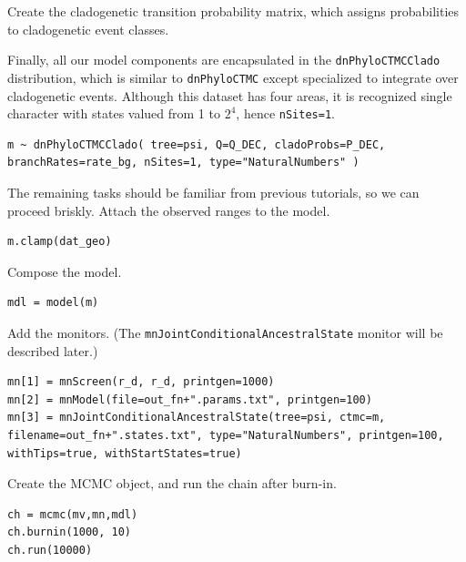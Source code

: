 Create the cladogenetic transition probability matrix, which assigns probabilities to cladogenetic event classes.

Finally, all our model components are encapsulated in the {\tt dnPhyloCTMCClado} distribution, which is similar to {\tt dnPhyloCTMC} except specialized to integrate over cladogenetic events.
Although this dataset has four areas, it is recognized single character with states valued from 1 to $2^4$, hence {\tt nSites=1}.

\begin{snugshade}
\begin{lstlisting}
m ~ dnPhyloCTMCClado( tree=psi, Q=Q_DEC, cladoProbs=P_DEC, branchRates=rate_bg, nSites=1, type="NaturalNumbers" )
\end{lstlisting}
\end{snugshade}

The remaining tasks should be familiar from previous tutorials, so we can proceed briskly.
Attach the observed ranges to the model.

\begin{snugshade}
\begin{lstlisting}
m.clamp(dat_geo)
\end{lstlisting}
\end{snugshade}

Compose the model.

\begin{snugshade}
\begin{lstlisting}
mdl = model(m)
\end{lstlisting}
\end{snugshade}

Add the monitors. (The {\tt mnJointConditionalAncestralState} monitor will be described later.)

\begin{snugshade}
\begin{lstlisting}
mn[1] = mnScreen(r_d, r_d, printgen=1000)
mn[2] = mnModel(file=out_fn+".params.txt", printgen=100)
mn[3] = mnJointConditionalAncestralState(tree=psi, ctmc=m, filename=out_fn+".states.txt", type="NaturalNumbers", printgen=100, withTips=true, withStartStates=true)
\end{lstlisting}
\end{snugshade}

Create the MCMC object, and run the chain after burn-in.
\begin{snugshade}
\begin{lstlisting}
ch = mcmc(mv,mn,mdl)
ch.burnin(1000, 10)
ch.run(10000)
\end{lstlisting}
\end{snugshade}

